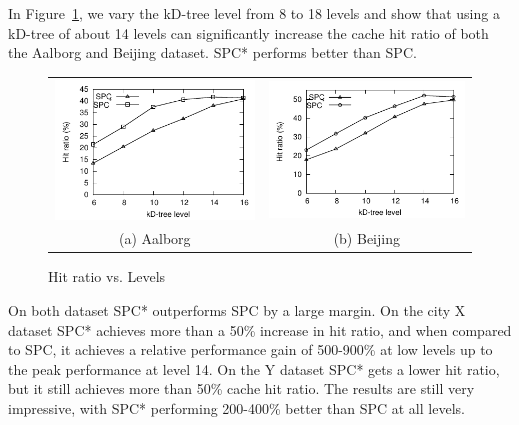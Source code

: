 %
In Figure~\ref{fig:levelVsHitRatio}, we vary the kD-tree level from 8 to 18 levels and show that using a kD-tree of about 14 levels can significantly increase the cache hit ratio of both the Aalborg and Beijing dataset. SPC* performs better than SPC.


\begin{figure}[htb]
\center
  \begin{tabular}{@{}c@{ }c@{}}
     \includegraphics[width=0.5\columnwidth]{figures/split_hitratio_aal.pdf}
     &
     \includegraphics[width=0.5\columnwidth]{figures/split_hitratio_bei.pdf}
      \\
     (a) Aalborg & (b)  Beijing
     \end{tabular}
\caption{Hit ratio vs. Levels}
\label{fig:levelVsHitRatio}
\end{figure}

On both dataset SPC* outperforms SPC by a large margin. On the city X dataset SPC* achieves more than a 50\% increase in hit ratio, and when compared to SPC, it achieves a relative performance gain of 500-900\% at low levels up to the peak performance at level 14.
On the Y dataset SPC* gets a lower hit ratio, but it still achieves more than 50\% cache hit ratio. The results are still very impressive, with SPC* performing 200-400\% better than SPC at all levels.

